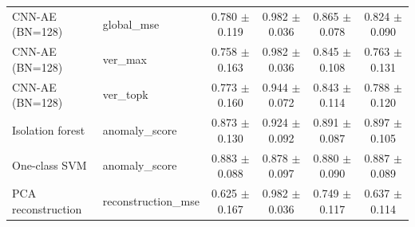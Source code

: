 \begin{table}[t]
\begin{tabular}{@{}llcccc@{}}
CNN-AE (BN=128) & global\_mse & 0.780 $\pm$ 0.119 & 0.982 $\pm$ 0.036 & 0.865 $\pm$ 0.078 & 0.824 $\pm$ 0.090 \\
CNN-AE (BN=128) & ver\_max & 0.758 $\pm$ 0.163 & 0.982 $\pm$ 0.036 & 0.845 $\pm$ 0.108 & 0.763 $\pm$ 0.131 \\
CNN-AE (BN=128) & ver\_topk & 0.773 $\pm$ 0.160 & 0.944 $\pm$ 0.072 & 0.843 $\pm$ 0.114 & 0.788 $\pm$ 0.120 \\
\addlinespace
Isolation forest & anomaly\_score & 0.873 $\pm$ 0.130 & 0.924 $\pm$ 0.092 & 0.891 $\pm$ 0.087 & 0.897 $\pm$ 0.105 \\
\addlinespace
One-class SVM & anomaly\_score & 0.883 $\pm$ 0.088 & 0.878 $\pm$ 0.097 & 0.880 $\pm$ 0.090 & 0.887 $\pm$ 0.089 \\
\addlinespace
PCA reconstruction & reconstruction\_mse & 0.625 $\pm$ 0.167 & 0.982 $\pm$ 0.036 & 0.749 $\pm$ 0.117 & 0.637 $\pm$ 0.114 \\
\bottomrule
\end{tabular}
\end{table}
